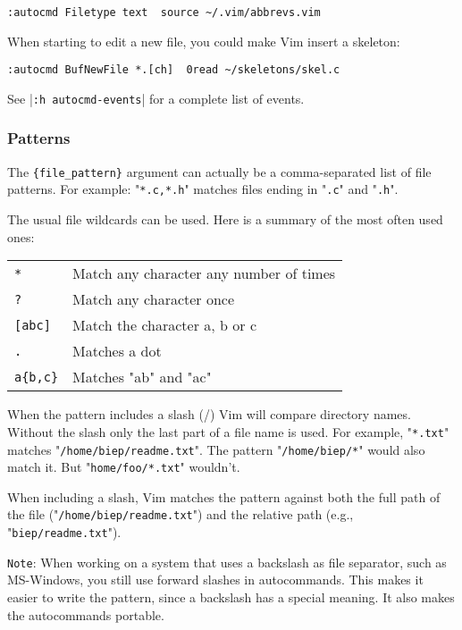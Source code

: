 \begin{Verbatim}[samepage=true]
 :autocmd Filetype text  source ~/.vim/abbrevs.vim
\end{Verbatim}

When starting to edit a new file, you could make Vim insert a skeleton:

\begin{Verbatim}[samepage=true]
 :autocmd BufNewFile *.[ch]  0read ~/skeletons/skel.c
\end{Verbatim}

See |\verb!:h autocmd-events!| for a complete list of events.

\subsubsection{Patterns}
The \verb!{file_pattern}! argument can actually be a comma-separated list of file patterns.
For example: "\verb!*.c,*.h!" matches files ending in "\verb!.c!" and "\verb!.h!".

The usual file wildcards can be used.
Here is a summary of the most often used ones:

\begin{center} \begin{tabular}{l l}
				\verb;*; & Match any character any number of times \\
				\verb;?; & Match any character once \\
				\verb;[abc]; & Match the character a, b or c \\
				\verb;.; & Matches a dot \\
				\verb;a{b,c}; & Matches "ab" and "ac" \\
\end{tabular} \end{center}

When the pattern includes a slash (/) Vim will compare directory names.
Without the slash only the last part of a file name is used.
For example, "\verb!*.txt!" matches "\verb!/home/biep/readme.txt!".
The pattern "\verb!/home/biep/*!" would also match it.
But "\verb!home/foo/*.txt!" wouldn't.

When including a slash, Vim matches the pattern against both the full path of the file ("\verb!/home/biep/readme.txt!") and the relative path (e.g., "\verb!biep/readme.txt!").

\verb!Note!: When working on a system that uses a backslash as file separator, such as MS-Windows, you still use forward slashes in autocommands.
This makes it easier to write the pattern, since a backslash has a special meaning.
It also makes the autocommands portable.

